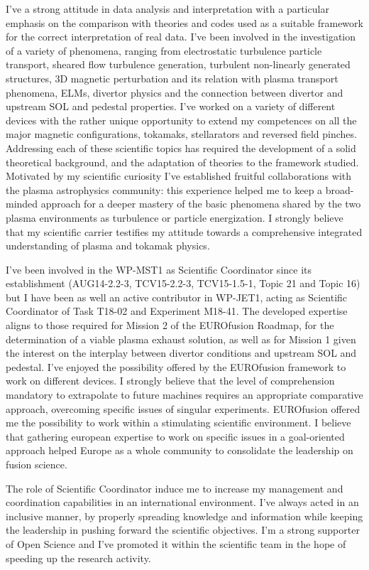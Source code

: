 \documentclass[12pt,a4paper,sans]{moderncv}        %
\begin{document}
I've a strong attitude in
data analysis and interpretation with a particular emphasis on the
comparison with theories and codes used as a suitable framework for the
correct interpretation of real data. I've been involved in
the investigation of a variety of phenomena, ranging from electrostatic
turbulence particle transport, sheared flow turbulence generation,
turbulent non-linearly generated structures, 3D
magnetic perturbation and its relation with plasma transport phenomena, ELMs, divertor
physics and the connection between divertor and upstream SOL and
pedestal properties. I've worked on a variety of different
devices with the rather unique opportunity to extend my competences
on all the major magnetic configurations, tokamaks,  stellarators and
reversed field pinches. Addressing each of these scientific 
topics has required the development of a solid theoretical
background, and the adaptation of theories to the framework
studied. Motivated by my scientific curiosity I've established
fruitful collaborations with the plasma astrophysics community: this
experience helped me to keep a broad-minded approach for a deeper mastery of the basic 
phenomena shared by the two plasma environments as turbulence or particle energization. 
I strongly believe that my scientific carrier testifies my 
attitude towards a comprehensive integrated understanding of plasma and tokamak physics. 

I've been involved in the WP-MST1 as Scientific Coordinator since
its establishment (AUG14-2.2-3, TCV15-2.2-3, TCV15-1.5-1, Topic 21 and
Topic 16) but I have been as well an active contributor in WP-JET1, acting as Scientific Coordinator
of Task T18-02 and Experiment M18-41. The developed expertise aligns
to those required for Mission 2 of the EUROfusion Roadmap, for the
determination of a viable plasma exhaust solution, as well as
for Mission 1 given the interest on the interplay between divertor
conditions and upstream SOL and pedestal. 
I've enjoyed the
possibility offered by the EUROfusion framework to work on
different devices. I strongly believe that the level of
comprehension mandatory to extrapolate to future
machines requires an appropriate comparative approach, overcoming 
specific issues of singular experiments.
EUROfusion offered me the possibility to work within a stimulating
scientific environment. I believe that gathering
european expertise to work on specific issues in a
goal-oriented approach helped Europe as a whole community to
consolidate the leadership on fusion science.

The role of Scientific Coordinator induce me to increase my  management and coordination capabilities in an
international environment. I've always acted in an inclusive
manner, by properly spreading knowledge and information while keeping
the leadership in pushing forward the scientific objectives. I'm a
strong supporter of Open Science and I've promoted it
within the scientific team in the hope of speeding up the research activity.
\end{document}
